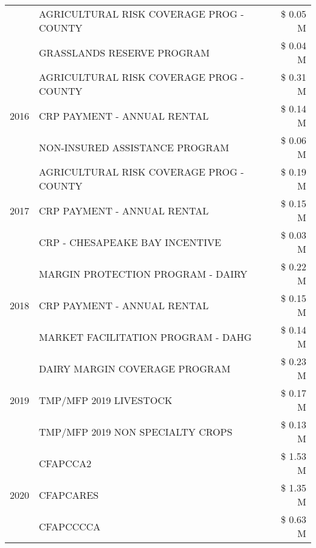 \begin{tabular}{llr}
 & AGRICULTURAL RISK COVERAGE PROG - COUNTY & \$ 0.05 M \\
 & GRASSLANDS RESERVE PROGRAM & \$ 0.04 M \\
\cline{1-3}
\multirow[t]{3}{*}{2016} & AGRICULTURAL RISK COVERAGE PROG - COUNTY & \$ 0.31 M \\
 & CRP PAYMENT - ANNUAL RENTAL & \$ 0.14 M \\
 & NON-INSURED ASSISTANCE PROGRAM & \$ 0.06 M \\
\cline{1-3}
\multirow[t]{3}{*}{2017} & AGRICULTURAL RISK COVERAGE PROG - COUNTY & \$ 0.19 M \\
 & CRP PAYMENT - ANNUAL RENTAL & \$ 0.15 M \\
 & CRP - CHESAPEAKE BAY INCENTIVE & \$ 0.03 M \\
\cline{1-3}
\multirow[t]{3}{*}{2018} & MARGIN PROTECTION PROGRAM - DAIRY & \$ 0.22 M \\
 & CRP PAYMENT - ANNUAL RENTAL & \$ 0.15 M \\
 & MARKET FACILITATION PROGRAM - DAHG & \$ 0.14 M \\
\cline{1-3}
\multirow[t]{3}{*}{2019} & DAIRY MARGIN COVERAGE PROGRAM & \$ 0.23 M \\
 & TMP/MFP 2019 LIVESTOCK & \$ 0.17 M \\
 & TMP/MFP 2019 NON SPECIALTY CROPS & \$ 0.13 M \\
\cline{1-3}
\multirow[t]{3}{*}{2020} & CFAPCCA2 & \$ 1.53 M \\
 & CFAPCARES & \$ 1.35 M \\
 & CFAPCCCCA & \$ 0.63 M \\
\cline{1-3}
\bottomrule
\end{tabular}
